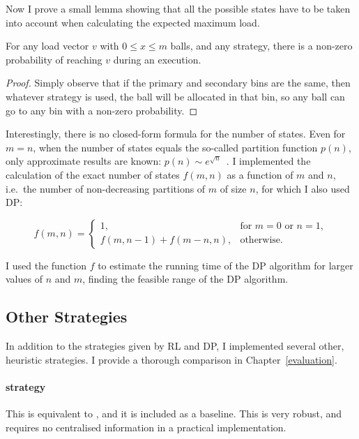 Now I prove a small lemma showing that all the possible states have to be taken into account when calculating the expected maximum load.


\begin{observation} \label{lemma: everystatereachable}
For any load vector $v$ with $0\leq x\leq m$ balls, and any strategy, there is a non-zero probability of reaching $v$ during an execution.
\end{observation}

\begin{proof}
    Simply observe that if the primary and secondary bins are the same, then whatever strategy is used, the ball will be allocated in that bin, so any ball can go to any bin with a non-zero probability.
\end{proof}


Interestingly, there is no closed-form formula for the number of states. Even for $m=n$, when the number of states equals the so-called partition function $p(n)$, only approximate results are known: $p(n) \sim e^{\sqrt{n}}$~\cite{hardy1918partitionfunction}. I implemented the calculation of the exact number of states $f(m, n)$ as a function of $m$ and $n$, i.e.\ the number of non-decreasing partitions of $m$ of size $n$, for which I also used DP:

\begin{equation} \label{eq: numberofpartitions}
    f(m, n) = \begin{cases}
        1, & \text{for } m=0\text{ or } n=1,\\
        f(m,n-1)+f(m-n,n), & \text{otherwise}.
    \end{cases}
\end{equation}


I used the function $f$ to estimate the running time of the DP algorithm for larger values of $n$ and $m$, finding the feasible range of the DP algorithm.


\subsection{Other Strategies} \label{two-thinning-otherstrategies}

In addition to the strategies given by RL and DP, I implemented several other, heuristic strategies. I provide a thorough comparison in Chapter~\ref{evaluation}.


\paragraph{\AlwaysAccept strategy}
This is equivalent to \OneChoice, and it is included as a baseline. This is very robust, and requires no centralised information in a practical implementation.


